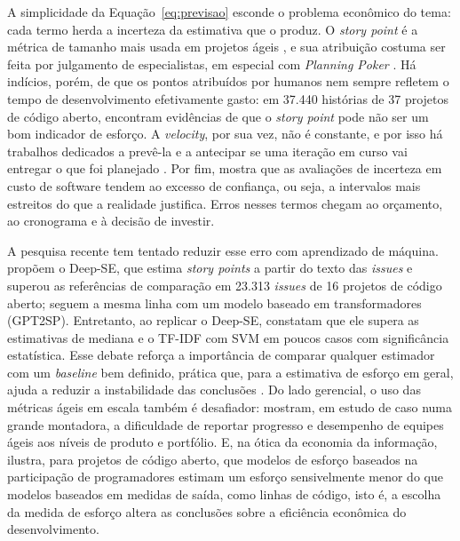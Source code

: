 A simplicidade da Equação~\ref{eq:previsao} esconde o problema econômico do
tema: cada termo herda a incerteza da estimativa que o produz. O
\textit{story point} é a métrica de tamanho mais usada em projetos ágeis
\cite{usman2014,fernandezdiego2020}, e sua atribuição costuma ser feita por
julgamento de especialistas, em especial com \textit{Planning Poker}
\cite{fernandezdiego2020}. Há indícios, porém, de que os pontos atribuídos por
humanos nem sempre refletem o tempo de desenvolvimento efetivamente gasto: em
37.440 histórias de 37 projetos de código aberto, 
encontram evidências de que o \textit{story point} pode não ser um bom
indicador de esforço. A
\textit{velocity}, por sua vez, não é constante, e por isso há trabalhos
dedicados a prevê-la \cite{hearty2009} e a antecipar se uma iteração em curso
vai entregar o que foi planejado \cite{choetkiertikul2018}. Por fim,
 mostra que as avaliações de incerteza em custo de
software tendem ao excesso de confiança, ou seja, a intervalos mais estreitos
do que a realidade justifica. Erros nesses termos chegam ao orçamento, ao
cronograma e à decisão de investir.

A pesquisa recente tem tentado reduzir esse erro com aprendizado de máquina.
 propõem o Deep-SE, que estima \textit{story
points} a partir do texto das \textit{issues} e superou as referências de
comparação em 23.313 \textit{issues} de 16 projetos de código aberto;
 seguem a mesma linha com um modelo baseado em
transformadores (GPT2SP). Entretanto, ao replicar o Deep-SE,
 constatam que ele supera as estimativas de mediana e o
TF-IDF com SVM em poucos casos com significância estatística. Esse debate
reforça a importância de comparar qualquer estimador com um \textit{baseline}
bem definido, prática que, para a estimativa de esforço em geral, ajuda a
reduzir a instabilidade das conclusões \cite{sarro2018}. Do lado gerencial, o uso das métricas ágeis em
escala também é desafiador:  mostram, em estudo de caso
numa grande montadora, a dificuldade de reportar progresso e desempenho de
equipes ágeis aos níveis de produto e portfólio. E, na ótica da economia da
informação,  ilustra, para projetos de código aberto, que
modelos de esforço baseados na participação de programadores estimam um esforço
sensivelmente menor do que modelos baseados em medidas de saída, como linhas de
código, isto é, a escolha da medida de esforço altera as conclusões sobre a
eficiência econômica do desenvolvimento.


